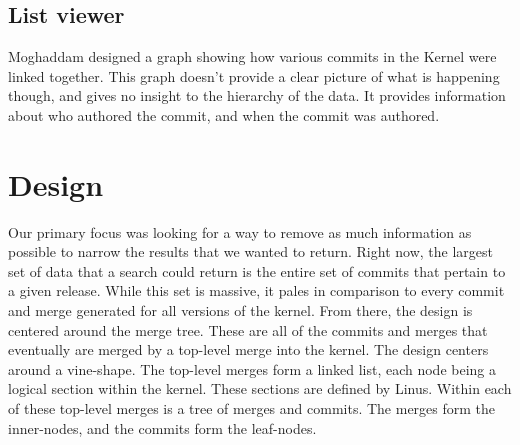 \documentclass[conference, draftclsnofoot]{IEEEtran}
\begin{document}



\subsection{List viewer}
Moghaddam designed a graph showing how various commits in the Kernel were
linked together. This graph doesn't provide a clear picture of what is
happening though, and gives no insight to the hierarchy of the data. It
provides information about who authored the commit, and when the commit was
authored.



\section{Design}

Our primary focus was looking for a way to remove as much information as
possible to narrow the results that we wanted to return. Right now, the largest
set of data that a search could return is the entire set of commits that
pertain to a given release. While this set is massive, it pales in comparison
to every commit and merge generated for all versions of the kernel. From there,
the design is centered around the merge tree. These are all of the commits and
merges that eventually are merged by a top-level merge into the kernel. The
design centers around a vine-shape. The top-level merges form a linked list,
each node being a logical section within the kernel. These sections are defined
by Linus. Within each of these top-level merges is a tree of merges and
commits. The merges form the inner-nodes, and the commits form the leaf-nodes.

\end{document}

